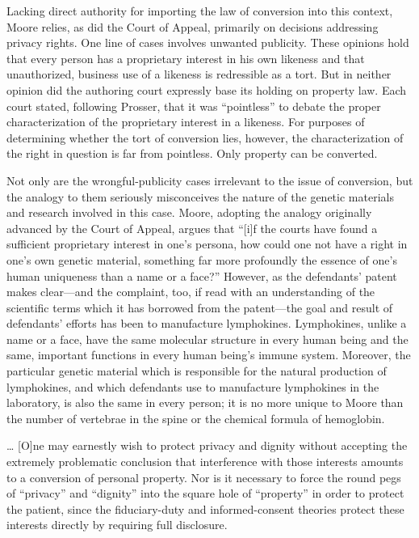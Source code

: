 Lacking direct authority for importing the law of conversion into this context,
Moore relies, as did the Court of Appeal, primarily on decisions  addressing
privacy rights. One line of cases involves unwanted publicity. These opinions
hold that every person has a proprietary interest in his own likeness and that
unauthorized, business use of a likeness is redressible as a tort. But in
neither opinion did the authoring court expressly base its holding on property
law. Each court stated, following Prosser, that it was ``pointless'' to debate
the proper characterization of the proprietary interest in a likeness. For
purposes of determining whether the tort of conversion lies, however, the
characterization of the right in question is far from pointless. Only property
can be converted.

Not only are the wrongful-publicity cases irrelevant to the issue of conversion,
but the analogy to them seriously misconceives the nature of the genetic
materials and research involved in this case. Moore, adopting the analogy
originally advanced by the Court of Appeal, argues that ``[i]f the courts have
found a sufficient proprietary interest in one's persona, how could one not
have a right in one's own genetic material, something far more profoundly the
essence of one's human uniqueness than a name or a face?'' However, as the
defendants' patent makes clear---and the complaint, too, if read with an
understanding of the scientific terms which it has borrowed from the
patent---the goal and result of defendants' efforts has been to manufacture
lymphokines.
Lymphokines, unlike a name or a face, have the same molecular structure in
every human being and the same, important functions in every human being's
immune system. Moreover, the particular genetic material which is responsible
for the natural production of lymphokines, and which defendants use to
manufacture lymphokines in the laboratory, is also the same in every person; it
is no more unique to Moore than the number of vertebrae in the spine or the
chemical formula of hemoglobin.

{\dots} [O]ne may earnestly wish to protect privacy and dignity without
accepting the extremely problematic conclusion that interference with those
interests amounts to a conversion of personal property. Nor is it necessary to
force the round pegs of ``privacy'' and ``dignity'' into the square hole of
``property'' in order to protect the patient, since the fiduciary-duty and
informed-consent theories protect these interests directly by requiring full
disclosure.

